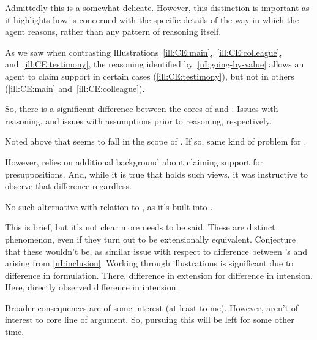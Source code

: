 \begin{note}
  Admittedly this is a somewhat delicate.
  However, this distinction is important as it highlights how \nI{} is concerned with the specific details of the way in which the agent reasons, rather than any pattern of reasoning itself.

  As we saw when contrasting Illustrations~\ref{ill:CE:main},~\ref{ill:CE:colleague}, and~\ref{ill:CE:testimony}, the reasoning identified by~\ref{nI:going-by-value} allows an agent to claim support in certain cases (\ref{ill:CE:testimony}), but not in others (\ref{ill:CE:main} and~\ref{ill:CE:colleague}).

  So, there is a significant difference between the cores of \wnf{} and \nI{}.
  Issues with reasoning, and issues with assumptions prior to reasoning, respectively.
\end{note}

\begin{note}
  Noted above that \wnf{} seems to fall in the scope of \widt{}.
  If so, same kind of problem for \widt{}.

  However, relies on additional background about claiming support for presuppositions.
    And, while it is true that \citeauthor{Wright:2011wn} holds such views, it was instructive to observe that difference regardless.

    No such alternative with relation to \citeauthor{Weisberg:2010to}, as it's built into \wnf{}.
\end{note}

\begin{note}[Hm]
  \color{return}
  This is brief, but it's not clear more needs to be said.
  These are distinct phenomenon, even if they turn out to be extensionally equivalent.
  Conjecture that these wouldn't be, as similar issue with respect to difference between \citeauthor{Wright:2011wn}'s \wrt{} and \nI{} arising from \ref{nI:inclusion}.
  Working through illustrations is significant due to difference in formulation.
  There, difference in extension for difference in intension.
  Here, directly observed difference in intension.

  Broader consequences are of some interest (at least to me).
  However, aren't of interest to core line of argument.
  So, pursuing this will be left for some other time.
\end{note}


